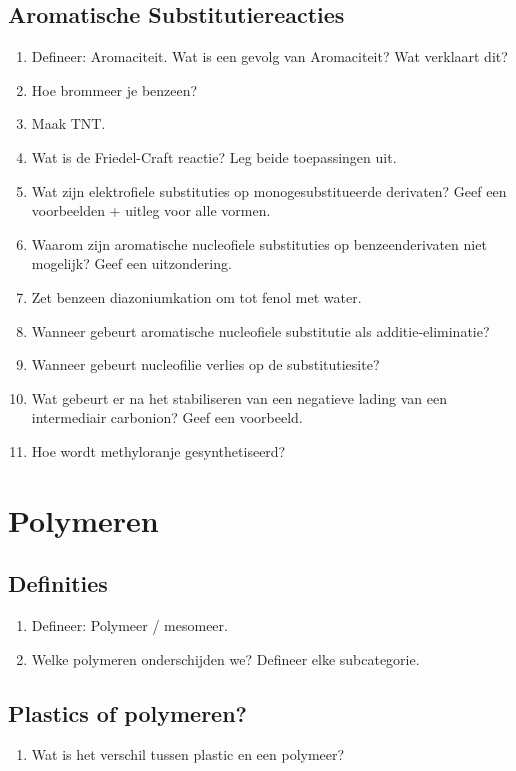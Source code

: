 \documentclass[a4paper,12pt]{article}
\begin{document}
    \subsection*{Aromatische Substitutiereacties}
    \begin{enumerate}
        \item Defineer: Aromaciteit. Wat is een gevolg van Aromaciteit? Wat verklaart dit?
        \item Hoe brommeer je benzeen?
        \item Maak TNT.
        \item Wat is de Friedel-Craft reactie? Leg beide toepassingen uit.
        \item Wat zijn elektrofiele substituties op monogesubstitueerde derivaten? Geef een voorbeelden + uitleg voor alle vormen.
        \item Waarom zijn aromatische nucleofiele substituties op benzeenderivaten niet mogelijk? Geef een uitzondering.
        \item Zet benzeen diazoniumkation om tot fenol met water.
        \item Wanneer gebeurt aromatische nucleofiele substitutie als additie-eliminatie? 
        \item Wanneer gebeurt nucleofilie verlies op de substitutiesite?
        \item Wat gebeurt er na het stabiliseren van een negatieve lading van een intermediair carbonion? Geef een voorbeeld.
        \item Hoe wordt methyloranje gesynthetiseerd?
    \end{enumerate}

    \section{Polymeren}
    \subsection*{Definities}
    \begin{enumerate}
        \item Defineer: Polymeer / mesomeer.
        \item Welke polymeren onderschijden we? Defineer elke subcategorie.
    \end{enumerate}
    \subsection*{Plastics of polymeren?}
    \begin{enumerate}
        \item Wat is het verschil tussen plastic en een polymeer?
    \end{enumerate}
\end{document}
